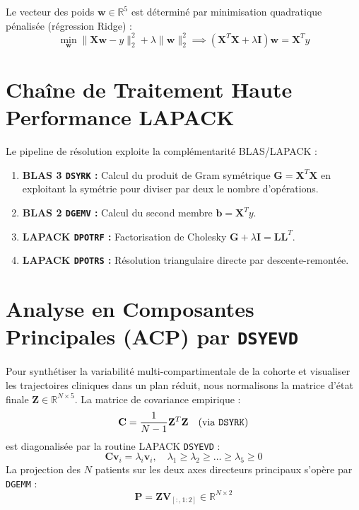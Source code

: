 \documentclass[11pt,a4paper]{report}
\theoremstyle{plain}
\theoremstyle{definition}
\theoremstyle{remark}
\begin{document}
Le vecteur des poids $\mathbf{w} \in \mathbb{R}^5$ est déterminé par minimisation quadratique pénalisée (régression Ridge) :
\begin{equation}
\min_{\mathbf{w}} \|\mathbf{X} \mathbf{w} - y\|_2^2 + \lambda \|\mathbf{w}\|_2^2 \implies (\mathbf{X}^T \mathbf{X} + \lambda \mathbf{I}) \mathbf{w} = \mathbf{X}^T y
\end{equation}

\section{Chaîne de Traitement Haute Performance LAPACK}
Le pipeline de résolution exploite la complémentarité BLAS/LAPACK :
\begin{enumerate}
    \item \textbf{BLAS 3 \texttt{DSYRK} :} Calcul du produit de Gram symétrique $\mathbf{G} = \mathbf{X}^T \mathbf{X}$ en exploitant la symétrie pour diviser par deux le nombre d'opérations.
    \item \textbf{BLAS 2 \texttt{DGEMV} :} Calcul du second membre $\mathbf{b} = \mathbf{X}^T y$.
    \item \textbf{LAPACK \texttt{DPOTRF} :} Factorisation de Cholesky $\mathbf{G} + \lambda \mathbf{I} = \mathbf{L} \mathbf{L}^T$.
    \item \textbf{LAPACK \texttt{DPOTRS} :} Résolution triangulaire directe par descente-remontée.
\end{enumerate}

\section{Analyse en Composantes Principales (ACP) par \texttt{DSYEVD}}
Pour synthétiser la variabilité multi-compartimentale de la cohorte et visualiser les trajectoires cliniques dans un plan réduit, nous normalisons la matrice d'état finale $\mathbf{Z} \in \mathbb{R}^{N \times 5}$. La matrice de covariance empirique :
\begin{equation}
\mathbf{C} = \frac{1}{N - 1} \mathbf{Z}^T \mathbf{Z} \quad \text{(via \texttt{DSYRK})}
\end{equation}
est diagonalisée par la routine LAPACK \texttt{DSYEVD} :
\begin{equation}
\mathbf{C} \mathbf{v}_i = \lambda_i \mathbf{v}_i, \quad \lambda_1 \ge \lambda_2 \ge \dots \ge \lambda_5 \ge 0
\end{equation}
La projection des $N$ patients sur les deux axes directeurs principaux s'opère par \texttt{DGEMM} :
\begin{equation}
\mathbf{P} = \mathbf{Z} \mathbf{V}_{[:, 1:2]} \in \mathbb{R}^{N \times 2}
\end{equation}
\end{document}
